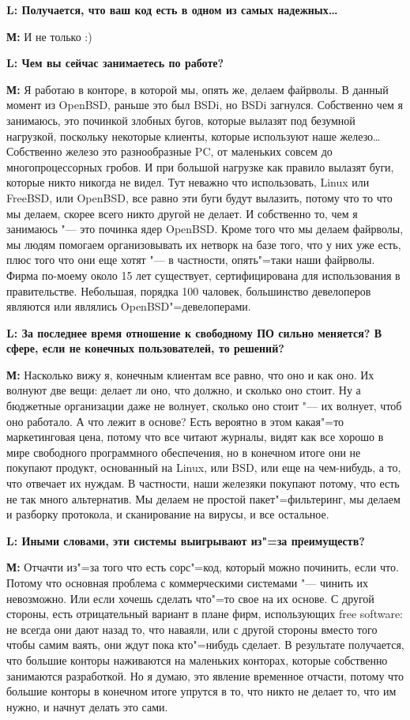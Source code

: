 \documentclass[10pt, a5paper]{article}
\begin{document}
{\noindent \bf L: Получается, что ваш код есть в одном из самых надежных\ldots}

{\noindent \bf М:} И не только :)

{\noindent \bf L: Чем вы сейчас занимаетесь по работе?}

{\noindent \bf М:} Я работаю в конторе, в которой мы, опять же, делаем файрволы. В данный момент из OpenBSD, раньше это был BSDi, но BSDi загнулся. Собственно чем я занимаюсь, это починкой злобных бугов, которые вылазят под безумной нагрузкой, поскольку некоторые клиенты, которые используют наше железо\ldots Собственно железо это разнообразные PC, от маленьких совсем до многопроцессорных гробов. И при большой нагрузке как правило вылазят буги, которые никто никогда не видел. Тут неважно что использовать, Linux или FreeBSD, или OpenBSD, все равно эти буги будут вылазить, потому что то что мы делаем, скорее всего никто другой не делает. И собственно то, чем я занимаюсь "--- это починка ядер OpenBSD.  Кроме того что мы делаем файрволы, мы людям помогаем организовывать их нетворк на базе того, что у них уже есть, плюс того что они еще хотят "--- в частности, опять"=таки наши файрволы. Фирма по-моему около 15 лет существует, сертифицирована для использования в правительстве. Небольшая, порядка 100 чаловек, большинство девелоперов являются или являлись OpenBSD"=девелоперами. 

{\noindent \bf L: За последнее время отношение к свободному ПО сильно меняется? В сфере, если не конечных пользователей, то решений?}

{\noindent \bf М:} Насколько вижу я, конечным клиентам все равно, что оно и как оно. Их волнуют две вещи: делает ли оно, что должно, и сколько оно стоит. Ну а бюджетные организации даже не волнует, сколько оно стоит "--- их волнует, чтоб оно работало. А что лежит в основе? Есть вероятно в этом какая"=то маркетинговая цена, потому что все читают журналы, видят как все хорошо в мире свободного программного обеспечения, но в конечном итоге они не покупают продукт, основанный на Linux, или BSD, или еще на чем-нибудь, а то, что отвечает их нуждам. В частности, наши железяки покупают потому, что есть не так много альтернатив. Мы делаем не простой пакет"=фильтеринг, мы делаем и разборку протокола, и сканирование на вирусы, и все остальное.

{\noindent \bf L: Иными словами, эти системы выигрывают из"=за преимуществ?}

{\noindent \bf М:} Отчачти из"=за того что есть сорс"=код, который можно починить, если что. Потому что основная проблема с  коммерческими системами "--- чинить их невозможно. Или если хочешь сделать что"=то свое на их основе. С другой стороны, есть отрицательный вариант в плане фирм, использующих free software: не всегда они дают назад то, что наваяли, или с другой стороны вместо того чтобы самим ваять, они ждут пока кто"=нибудь сделает. В результате получается, что большие конторы наживаются на маленьких конторах, которые собственно занимаются разработкой. Но я думаю, это явление временное отчасти, потому что большие конторы в конечном итоге упрутся в то, что никто не делает то, что им нужно, и начнут делать это сами.
\end{document}
